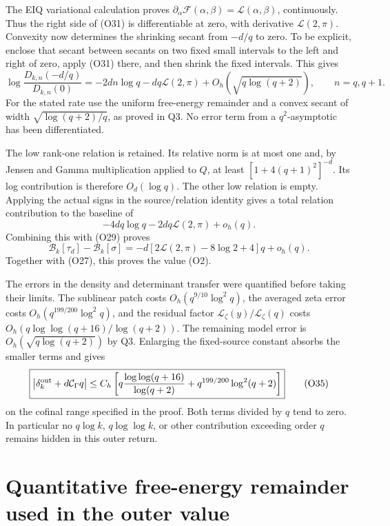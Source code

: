 \documentclass[11pt,a4paper]{article}
\begin{document}
The EIQ variational calculation proves
\(\partial_\alpha\mathcal F(\alpha,\beta)=\mathcal L(\alpha,\beta)\),
continuously. Thus the right side of (O31) is differentiable at zero,
with derivative \(\mathcal L(2,\pi)\). Convexity now determines the
shrinking secant from \(-d/q\) to zero. To be explicit, enclose that
secant between secants on two fixed small intervals to the left and
right of zero, apply (O31) there, and then shrink the fixed intervals.
This gives \[
\boxed{\log\frac{D_{k,n}(-d/q)}{D_{k,n}(0)}
=-2dn\log q-dq\mathcal L(2,\pi)+O_h(\sqrt{q\log(q+2)}),
\qquad n=q,q+1.}\tag{O33}
\] For the stated rate use the uniform free-energy remainder and a
convex secant of width \(\sqrt{\log(q+2)/q}\), as proved in Q3. No error
term from a \(q^2\)-asymptotic has been differentiated.

The low rank-one relation is retained. Its relative norm is at most one
and, by Jensen and Gamma multiplication applied to \(Q\), at least
\([1+4(q+1)^2]^{-d}\). Its log contribution is therefore
\(O_d(\log q)\). The other low relation is empty. Applying the actual
signs in the source/relation identity gives a total relation
contribution to the baseline of \[
-4dq\log q-2dq\mathcal L(2,\pi)+o_h(q).\tag{O34}
\] Combining this with (O29) proves \[
\mathcal B_k[\tau_d]-\mathcal B_k[\sigma]
=-d[2\mathcal L(2,\pi)-8\log2+4]q+o_h(q).
\] Together with (O27), this proves the value (O2).

The errors in the density and determinant transfer were quantified
before taking their limits. The sublinear patch costs
\(O_h(q^{9/10}\log^2q)\), the averaged zeta error costs
\(O_h(q^{199/200}\log^2q)\), and the residual factor
\(\mathcal L_\zeta(y)/\mathcal L_\zeta(q)\) costs
\(O_h(q\log\log(q+16)/\log(q+2))\). The remaining model error is
\(O_h(\sqrt{q\log(q+2)})\) by Q3. Enlarging the fixed-source constant
absorbs the smaller terms and gives \[
\boxed{\left|\delta_k^{\rm out}+d\mathcal C_\Gamma q\right|
\le C_h\left[
q\frac{\log\log(q+16)}{\log(q+2)}
+q^{199/200}\log^2(q+2)\right]}
\tag{O35}
\] on the cofinal range specified in the proof. Both terms divided by
\(q\) tend to zero. In particular no \(q\log k\), \(q\log\log k\), or
other contribution exceeding order \(q\) remains hidden in this outer
return.

\newpage

\section{Quantitative free-energy remainder used in the outer
value}\label{sa:quantitative-free-energy-remainder-used-in-the-outer-value}
\end{document}
